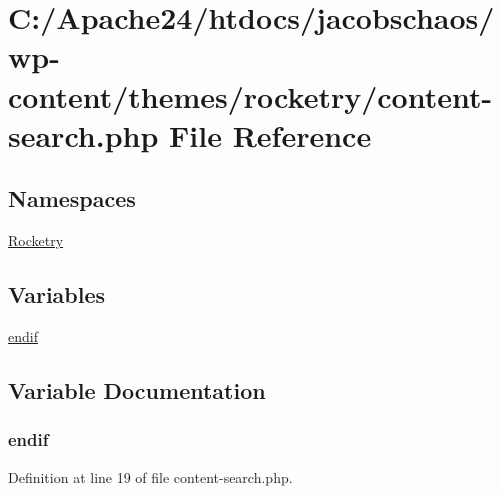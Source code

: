 \hypertarget{content-search_8php}{}\section{C\+:/\+Apache24/htdocs/jacobschaos/wp-\/content/themes/rocketry/content-\/search.php File Reference}
\label{content-search_8php}
\subsection*{Namespaces}
\begin{DoxyCompactItemize}
\item 
 \hyperlink{namespace_rocketry}{Rocketry}
\end{DoxyCompactItemize}
\subsection*{Variables}
\begin{DoxyCompactItemize}
\item 
\hyperlink{content-search_8php_a82cd33ca97ff99f2fcc5e9c81d65251b}{endif}
\end{DoxyCompactItemize}


\subsection{Variable Documentation}
\hypertarget{content-search_8php_a82cd33ca97ff99f2fcc5e9c81d65251b}{}
\subsubsection[{endif}]{\setlength{\rightskip}{0pt plus 5cm}endif}\label{content-search_8php_a82cd33ca97ff99f2fcc5e9c81d65251b}


Definition at line 19 of file content-\/search.\+php.

